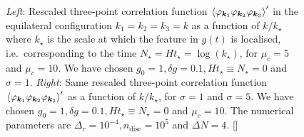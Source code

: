 \documentclass[11pt]{article}
\numberwithin{equation}{section} %
\begin{document}
\begin{figure}[h!]
  \centering
  \hspace*{0.2cm}
  \vspace*{0.2cm}
  \caption{\textit{Left}: Rescaled three-point correlation function $\braket{\varphi_{\bm{k}_1} \varphi_{\bm{k}_2} \varphi_{\bm{k}_3}}'$ in the equilateral configuration $k_1=k_2=k_3=k$ as a function of $k/k_\star$ where $k_\star$ is the scale at which the feature in $g(t)$ is localised, i.e.~corresponding to the time $N_\star = H t_\star = \log(k_\star)$, for $\mu_c = 5$ and $\mu_c = 10$. We have chosen $g_0 = 1, \delta g = 0.1, Ht_\star \equiv N_\star = 0$ and $\sigma = 1$. \textit{Right}: Same rescaled three-point correlation function $\braket{\varphi_{\bm{k}_1} \varphi_{\bm{k}_2} \varphi_{\bm{k}_3}}'$ as a function of $k/k_\star$, for $\sigma = 1$ and $\sigma = 5$. We have chosen $g_0 = 1, \delta g = 0.1, Ht_\star \equiv N_\star = 0$ and $\mu_c = 10$. The numerical parameters are $\Delta_r = 10^{-4}, n_{\text{disc}} = 10^5$ and $\Delta N = 4$. [\href{https://github.com/deniswerth/CosmoFlow/blob/main/CosmoFlow/Massless_dphi3/TimeDependentCouplings.ipynb}{\faGithub}]}
  \label{fig: time dependent couplings}
\end{figure}
\end{document}
